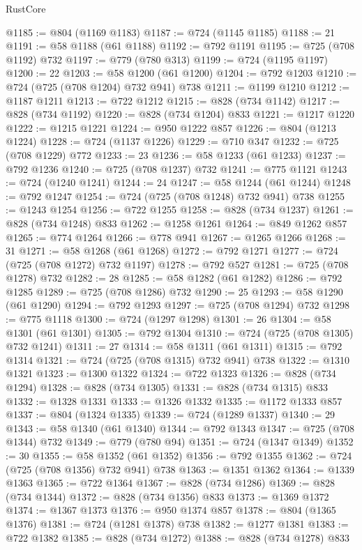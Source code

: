 \begin{lexlean}{RustCore}
\begin{coremodule}
@1185 := @804 (@1169 @1183)
@1187 := @724 (@1145 @1185)
@1188 := 21
@1191 := @58 @1188 (@61 @1188)
@1192 := @792 @1191
@1195 := @725 (@708 @1192) @732
@1197 := @779 (@780 @313)
@1199 := @724 (@1195 @1197)
@1200 := 22
@1203 := @58 @1200 (@61 @1200)
@1204 := @792 @1203
@1210 := @724 (@725 (@708 @1204) @732 @941) @738
@1211 := @1199 @1210
@1212 := @1187 @1211
@1213 := @722 @1212
@1215 := @828 (@734 @1142)
@1217 := @828 (@734 @1192)
@1220 := @828 (@734 @1204) @833
@1221 := @1217 @1220
@1222 := @1215 @1221
@1224 := @950 @1222 @857
@1226 := @804 (@1213 @1224)
@1228 := @724 (@1137 @1226)
@1229 := @710 @347
@1232 := @725 (@708 @1229) @772
@1233 := 23
@1236 := @58 @1233 (@61 @1233)
@1237 := @792 @1236
@1240 := @725 (@708 @1237) @732
@1241 := @775 @1121
@1243 := @724 (@1240 @1241)
@1244 := 24
@1247 := @58 @1244 (@61 @1244)
@1248 := @792 @1247
@1254 := @724 (@725 (@708 @1248) @732 @941) @738
@1255 := @1243 @1254
@1256 := @722 @1255
@1258 := @828 (@734 @1237)
@1261 := @828 (@734 @1248) @833
@1262 := @1258 @1261
@1264 := @849 @1262 @857
@1265 := @774 @1264
@1266 := @778 @941
@1267 := @1265 @1266
@1268 := 31
@1271 := @58 @1268 (@61 @1268)
@1272 := @792 @1271
@1277 := @724 (@725 (@708 @1272) @732 @1197)
@1278 := @792 @527
@1281 := @725 (@708 @1278) @732
@1282 := 28
@1285 := @58 @1282 (@61 @1282)
@1286 := @792 @1285
@1289 := @725 (@708 @1286) @732
@1290 := 25
@1293 := @58 @1290 (@61 @1290)
@1294 := @792 @1293
@1297 := @725 (@708 @1294) @732
@1298 := @775 @1118
@1300 := @724 (@1297 @1298)
@1301 := 26
@1304 := @58 @1301 (@61 @1301)
@1305 := @792 @1304
@1310 := @724 (@725 (@708 @1305) @732 @1241)
@1311 := 27
@1314 := @58 @1311 (@61 @1311)
@1315 := @792 @1314
@1321 := @724 (@725 (@708 @1315) @732 @941) @738
@1322 := @1310 @1321
@1323 := @1300 @1322
@1324 := @722 @1323
@1326 := @828 (@734 @1294)
@1328 := @828 (@734 @1305)
@1331 := @828 (@734 @1315) @833
@1332 := @1328 @1331
@1333 := @1326 @1332
@1335 := @1172 @1333 @857
@1337 := @804 (@1324 @1335)
@1339 := @724 (@1289 @1337)
@1340 := 29
@1343 := @58 @1340 (@61 @1340)
@1344 := @792 @1343
@1347 := @725 (@708 @1344) @732
@1349 := @779 (@780 @94)
@1351 := @724 (@1347 @1349)
@1352 := 30
@1355 := @58 @1352 (@61 @1352)
@1356 := @792 @1355
@1362 := @724 (@725 (@708 @1356) @732 @941) @738
@1363 := @1351 @1362
@1364 := @1339 @1363
@1365 := @722 @1364
@1367 := @828 (@734 @1286)
@1369 := @828 (@734 @1344)
@1372 := @828 (@734 @1356) @833
@1373 := @1369 @1372
@1374 := @1367 @1373
@1376 := @950 @1374 @857
@1378 := @804 (@1365 @1376)
@1381 := @724 (@1281 @1378) @738
@1382 := @1277 @1381
@1383 := @722 @1382
@1385 := @828 (@734 @1272)
@1388 := @828 (@734 @1278) @833

\end{coremodule}
\end{lexlean}
